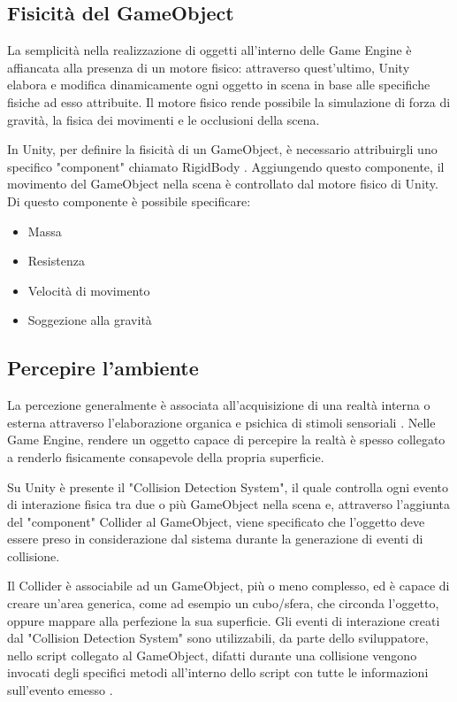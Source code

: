 \subsection{Fisicità del GameObject}

La semplicità nella realizzazione di oggetti all'interno delle Game Engine è affiancata alla presenza di un motore fisico: attraverso quest'ultimo, Unity elabora e modifica dinamicamente ogni oggetto in scena in base alle specifiche fisiche ad esso attribuite. Il motore fisico rende possibile la simulazione di forza di gravità, la fisica dei movimenti e le occlusioni della scena.

\medskip

In Unity, per definire la fisicità di un GameObject, è necessario attribuirgli uno specifico "component" chiamato RigidBody \cite{unity_rigidbody}. Aggiungendo questo componente, il movimento del GameObject nella scena è controllato dal motore fisico di Unity. Di questo componente è possibile specificare:
\begin{itemize}
    \item Massa
    \item Resistenza
    \item Velocità di movimento
    \item Soggezione alla gravità
\end{itemize}

\subsection{Percepire l'ambiente}

La percezione generalmente è associata all'acquisizione di una realtà interna o esterna attraverso l'elaborazione organica e psichica di stimoli sensoriali \cite{treccani}. Nelle Game Engine, rendere un oggetto capace di percepire la realtà è spesso collegato a renderlo fisicamente consapevole della propria superficie.

\medskip

Su Unity è presente il "Collision Detection System", il quale controlla ogni evento di interazione fisica tra due o più GameObject nella scena e, attraverso l'aggiunta del "component" Collider al GameObject, viene specificato che l'oggetto deve essere preso in considerazione dal sistema durante la generazione di eventi di collisione.

\medskip

Il Collider è associabile ad un GameObject, più o meno complesso, ed è capace di creare un'area generica, come ad esempio un cubo/sfera, che circonda l'oggetto, oppure mappare alla perfezione la sua superficie. Gli eventi di interazione creati dal "Collision Detection System" sono utilizzabili, da parte dello sviluppatore, nello script collegato al GameObject, difatti durante una collisione vengono invocati degli specifici metodi all'interno dello script con tutte le informazioni sull'evento emesso \cite{unity_collision}.

